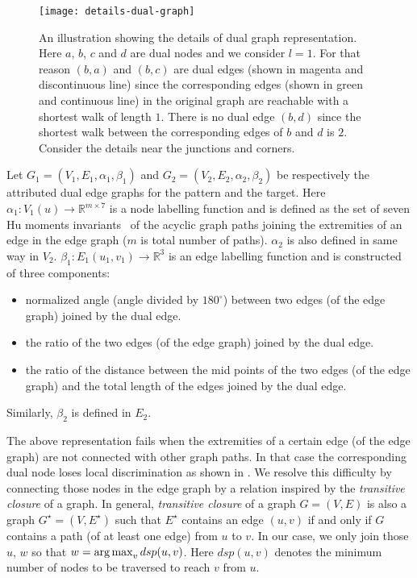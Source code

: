 \begin{figure}[!t]
\begin{center}
\texttt{[image: details-dual-graph]}
\caption{An illustration showing the details of dual graph representation. Here $a$, $b$, $c$ and $d$ are dual nodes and we consider $l=1$. For that reason $(b,a)$ and $(b,c)$ are dual edges (shown in magenta and discontinuous line) since the corresponding edges (shown in green and continuous line) in the original graph are reachable with a shortest walk of length $1$. There is no dual edge $(b,d)$ since the shortest walk between the corresponding edges of $b$ and $d$ is $2$. Consider the details near the junctions and corners.}
\end{center}
\label{fig:pg:details-dual-graph}
\end{figure}

Let $G_1=(V_1,E_1,\alpha_1,\beta_1)$ and $G_2=(V_2,E_2,\alpha_2,\beta_2)$ be respectively the attributed dual edge graphs for the pattern and the target. Here $\alpha_1:V_1(u)\rightarrow \mathbb{R}^{m\times 7}$ is a node labelling function and is defined as the set of seven Hu moments invariants~\cite{Hu1962} of the acyclic graph paths joining the extremities of an edge in the edge graph ($m$ is total number of paths). $\alpha_2$ is also defined in same way in $V_2$. $\beta_1:E_1(u_1,v_1)\rightarrow \mathbb{R}^3$ is an edge labelling function and is constructed of three components: 

\begin{itemize}
\item normalized angle (angle divided by $180^\circ$) between two edges (of the edge graph) joined by the dual edge.
\item the ratio of the two edges (of the edge graph) joined by the dual edge.
\item the ratio of the distance between the mid points of the two edges (of the edge graph) and the total length of the edges joined by the dual edge.
\end{itemize}

Similarly, $\beta_2$ is defined in $E_2$.


The above representation fails when the extremities of a certain edge (of the edge graph) are not connected with other graph paths. In that case the corresponding dual node loses local discrimination as shown in . We resolve this difficulty by connecting those nodes in the edge graph by a relation inspired by the \emph{transitive closure} of a graph. In general, \emph{transitive closure} of a graph $G=(V,E)$ is also a graph $G^\star=(V,E^\star)$ such that $E^\star$ contains an edge $(u,v)$ if and only if $G$ contains a path (of at least one edge) from $u$ to $v$. In our case, we only join those $u$, $w$ so that $w=\operatorname*{arg\,max}_v dsp(u,v)$. Here $dsp(u,v)$ denotes the minimum number of nodes to be traversed to reach $v$ from $u$.

